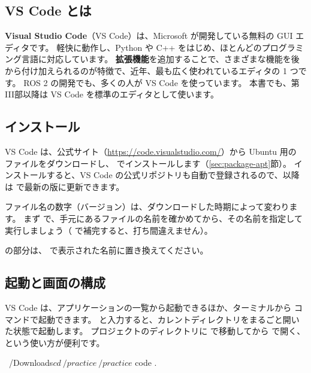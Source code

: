 \subsection{VS Code とは}

\textbf{Visual Studio Code}（VS Code）は、Microsoft が開発している無料の GUI エディタです。
軽快に動作し、Python や C++ をはじめ、ほとんどのプログラミング言語に対応しています。
\textbf{拡張機能}を追加することで、さまざまな機能を後から付け加えられるのが特徴で、近年、最も広く使われているエディタの 1 つです。
ROS 2 の開発でも、多くの人が VS Code を使っています。
本書でも、第III部以降は VS Code を標準のエディタとして使います。

\subsection{インストール}

VS Code は、公式サイト（\url{https://code.visualstudio.com/}）から Ubuntu 用の  ファイルをダウンロードし、 でインストールします（\ref{sec:package-apt}節）。
インストールすると、VS Code の公式リポジトリも自動で登録されるので、以降は  で最新の版に更新できます。

ファイル名の数字（バージョン）は、ダウンロードした時期によって変わります。
まず  で、手元にあるファイルの名前を確かめてから、その名前を指定して実行しましょう（ で補完すると、打ち間違えません）。


 の部分は、 で表示された名前に置き換えてください。

\subsection{起動と画面の構成}

VS Code は、アプリケーションの一覧から起動できるほか、ターミナルから  コマンドで起動できます。
 と入力すると、カレントディレクトリをまるごと開いた状態で起動します。
プロジェクトのディレクトリに  で移動してから  で開く、という使い方が便利です。

\begin{terminal}
~/Downloads$ cd ~/practice
~/practice$ code .
\end{terminal}

